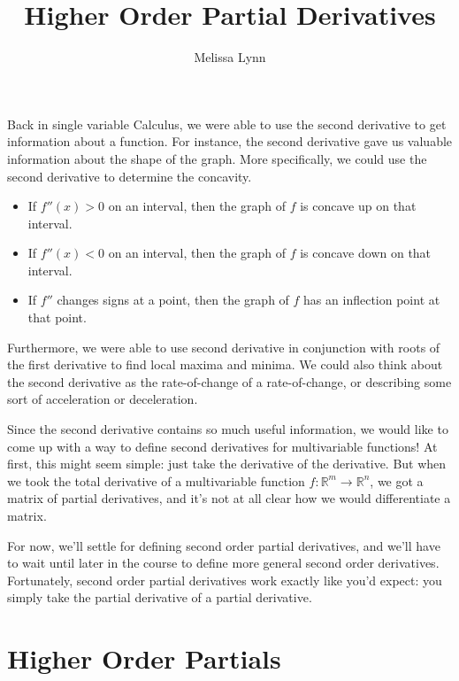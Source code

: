 \documentclass{ximera}
\title{Higher Order Partial Derivatives}
\author{Melissa Lynn}
\begin{document}
\begin{abstract}
\end{abstract}
\maketitle


Back in single variable Calculus, we were able to use the second derivative to get information about a function. For instance, the second derivative gave us valuable information about the shape of the graph. More specifically, we could use the second derivative to determine the concavity.
\begin{itemize}
\item If $f''(x)>0$ on an interval, then the graph of $f$ is concave up on that interval.
\item If $f''(x)<0$ on an interval, then the graph of $f$ is concave down on that interval.
\item If $f''$ changes signs at a point, then the graph of $f$ has an inflection point at that point.
\end{itemize}
Furthermore, we were able to use second derivative in conjunction with roots of the first derivative to find local maxima and minima. We could also think about the second derivative as the rate-of-change of a rate-of-change, or describing some sort of acceleration or deceleration.

Since the second derivative contains so much useful information, we would like to come up with a way to define second derivatives for multivariable functions! At first, this might seem simple: just take the derivative of the derivative. But when we took the total derivative of a multivariable function $f:\mathbb{R}^m\rightarrow\mathbb{R}^n$, we got a matrix of partial derivatives, and it's not at all clear how we would differentiate a matrix.

For now, we'll settle for defining second order partial derivatives, and we'll have to wait until later in the course to define more general second order derivatives. Fortunately, second order partial derivatives work exactly like you'd expect: you simply take the partial derivative of a partial derivative.

\section*{Higher Order Partials}
\end{document}
